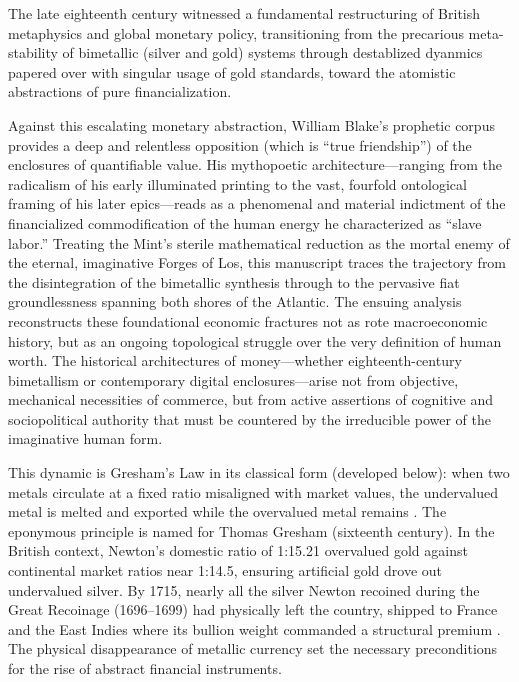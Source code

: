 \documentclass[
]{article}
\begin{document}
The late eighteenth century witnessed a fundamental restructuring of
British metaphysics and global monetary policy, transitioning from the
precarious meta-stability of bimetallic (silver and gold) systems
through destablized dyanmics papered over with singular usage of gold
standards, toward the atomistic abstractions of pure financialization.

Against this escalating monetary abstraction, William Blake's prophetic
corpus provides a deep and relentless opposition (which is ``true
friendship'') of the enclosures of quantifiable value. His mythopoetic
architecture---ranging from the radicalism of his early illuminated
printing to the vast, fourfold ontological framing of his later
epics---reads as a phenomenal and material indictment of the
financialized commodification of the human energy he characterized as
``slave labor.'' Treating the Mint's sterile mathematical reduction as
the mortal enemy of the eternal, imaginative Forges of Los, this
manuscript traces the trajectory from the disintegration of the
bimetallic synthesis through to the pervasive fiat groundlessness
spanning both shores of the Atlantic. The ensuing analysis reconstructs
these foundational economic fractures not as rote macroeconomic history,
but as an ongoing topological struggle over the very definition of human
worth. The historical architectures of money---whether
eighteenth-century bimetallism or contemporary digital
enclosures---arise not from objective, mechanical necessities of
commerce, but from active assertions of cognitive and sociopolitical
authority that must be countered by the irreducible power of the
imaginative human form.

This dynamic is Gresham's Law in its classical form (developed below):
when two metals circulate at a fixed ratio misaligned with market
values, the undervalued metal is melted and exported while the
overvalued metal remains \citep{thornton1802nature}. The eponymous
principle is named for Thomas Gresham (sixteenth century). In the
British context, Newton's domestic ratio of 1:15.21 overvalued gold
against continental market ratios near 1:14.5, ensuring artificial gold
drove out undervalued silver. By 1715, nearly all the silver Newton
recoined during the Great Recoinage (1696--1699) had physically left the
country, shipped to France and the East Indies where its bullion weight
commanded a structural premium
\citep{quinn1996competing, quinn2007recoinage}. The physical
disappearance of metallic currency set the necessary preconditions for
the rise of abstract financial instruments.
\end{document}
